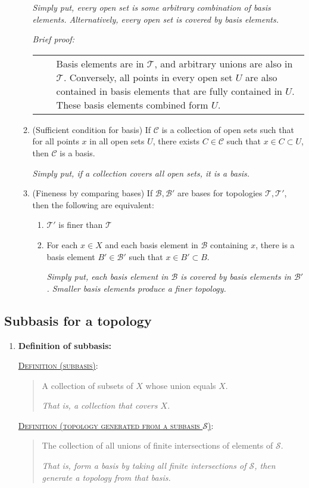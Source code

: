 \documentclass[letterpaper, 12pt]{article}
\newcommand{\ms}[1]{\mathscr{#1}}
\newcommand{\defn}[2]{\textsc{\underline{Definition (#1)}:}\begin{quote} #2\end{quote}}
\newenvironment{briefproof}{\footnotesize\begin{flushleft}\textit{Brief proof:}\par\begin{tabular}{l|p{0.8\textwidth}}$\quad$&}{\\
    \end{tabular}\end{flushleft}}
\begin{document}
\begin{enumerate}[resume]
\begin{enumerate}
                \textit{Simply put, every open set is some arbitrary combination of basis elements. Alternatively, every open set is covered by basis elements.}
                \begin{briefproof}
                Basis elements are in $\ms{T}$, and arbitrary unions are also in $\ms{T}$. Conversely, all points in every open set $U$ are also contained in basis elements that are fully contained in $U$. These basis elements combined form $U$.
                \end{briefproof}

                \item (Sufficient condition for basis) If $\ms{C}$ is a collection of open sets such that for all points $x$ in all open sets $U$, there exists $C\in\ms{C}$ such that $x\in C\subset U$, then $\ms{C}$ is a basis.

                \textit{Simply put, if a collection covers all open sets, it is a basis.}

                \item (Fineness by comparing bases) If $\ms{B}, \ms{B'}$ are bases for topologies $\ms{T}, \ms{T'}$, then the following are equivalent:
                \begin{enumerate}
                    \item $\ms{T'}$ is finer than $\ms{T}$
                    \item For each $x\in X$ and each basis element in $\ms{B}$ containing $x$, there is a basis element $B'\in\ms{B'}$ such that $x\in B' \subset B$.

                    \textit{Simply put, each basis element in $\ms{B}$ is covered by basis elements in $\ms{B'}$. Smaller basis elements produce a finer topology.}
                \end{enumerate}
            \end{enumerate}
        \end{enumerate}
    \subsection{Subbasis for a topology}
        \begin{enumerate}[resume]
        \item \textbf{Definition of subbasis:}

            \defn{subbasis}{A collection of subsets of $X$ whose union equals $X$.\par\textit{That is, a collection that covers $X$.}}
            \defn{topology generated from a subbasis $\ms{S}$}{The collection of all unions of finite intersections of elements of $\ms{S}$.\par\textit{That is, form a basis by taking all finite intersections of $\ms{S}$, then generate a topology from that basis.}}
        \end{enumerate}
\end{document}
